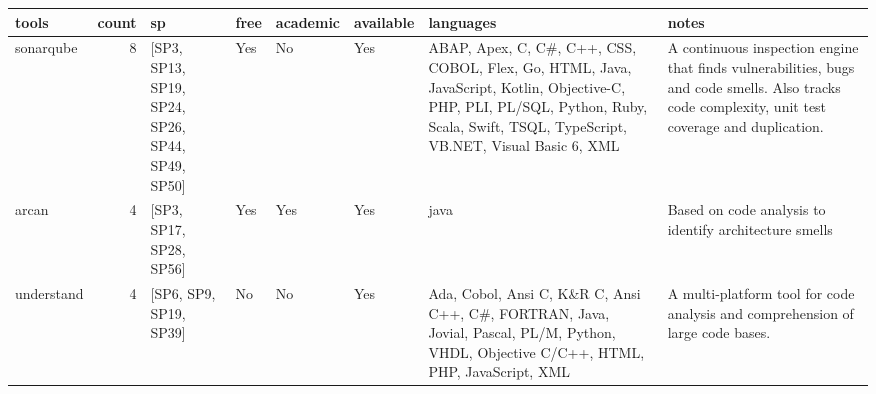 \begin{tabular}{lrllllll}
\toprule
               tools &  count &                                                     sp &  free & academic & available &                                                                                                                                                                               languages &                                                                                                                                                                                                                                                                                                                                                                                                            notes \\
\midrule
           sonarqube &      8 &        [SP3, SP13, SP19, SP24, SP26, SP44, SP49, SP50] &   Yes &       No &       Yes &  ABAP, Apex, C, C\#, C++, CSS, COBOL, Flex, Go, HTML, Java, JavaScript, Kotlin, Objective-C, PHP, PLI, PL/SQL, Python, Ruby, Scala, Swift, TSQL, TypeScript, VB.NET, Visual Basic 6, XML &                                                                                                                                                                                                                                                                A continuous inspection engine that finds vulnerabilities, bugs and code smells. Also tracks code complexity, unit test coverage and duplication. \\
               arcan &      4 &                                [SP3, SP17, SP28, SP56] &   Yes &      Yes &       Yes &                                                                                                                                                                                    java &                                                                                                                                                                                                                                                                                                                                                           Based on code analysis to identify architecture smells \\
          understand &      4 &                                 [SP6, SP9, SP19, SP39] &    No &       No &       Yes &                                                 Ada, Cobol, Ansi C, K\&R C, Ansi C++, C\#, FORTRAN, Java, Jovial, Pascal, PL/M, Python, VHDL, Objective C/C++, HTML, PHP, JavaScript, XML &                                                                                                                                                                                                                                                                                                                                   A multi-platform tool for code analysis and comprehension of large code bases. \\

\end{tabular}
